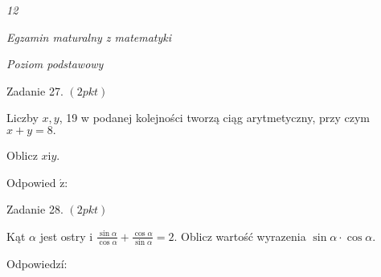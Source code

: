 \documentclass[a4paper,12pt]{article}
\begin{document}
{\it 12}

{\it Egzamin maturalny z matematyki}

{\it Poziom podstawowy}

Zadanie 27. $(2pkt)$

Liczby $x, y$, 19 w podanej kolejności tworzą ciąg arytmetyczny, przy czym $x+y=8.$

Oblicz $x\mathrm{i}y.$

Odpowied $\acute{\mathrm{z}}$:

Zadanie 28. $(2pkt)$

Kąt $\alpha$ jest ostry i $\displaystyle \frac{\sin\alpha}{\cos\alpha}+\frac{\cos\alpha}{\sin\alpha}=2$. Oblicz wartość wyrazenia $\sin\alpha\cdot\cos\alpha.$

Odpowiedzí:
\end{document}
